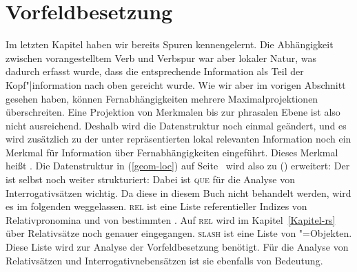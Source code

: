 \section{Vorfeldbesetzung}

Im letzten Kapitel haben wir bereits Spuren kennengelernt. Die Abhängigkeit zwischen vorangestelltem
Verb und Verbspur war aber lokaler Natur, was dadurch erfasst wurde, dass die entsprechende Information
als Teil der Kopf"|information nach oben gereicht wurde. Wie wir aber im vorigen Abschnitt gesehen haben,
können Fernabhängigkeiten mehrere Maximalprojektionen überschreiten. Eine Projektion von Merkmalen
bis zur phrasalen Ebene ist also nicht ausreichend. Deshalb wird die Datenstruktur noch einmal geändert,
und es wird zusätzlich zu der unter \local repräsentierten lokal relevanten Information noch ein
Merkmal für Information über Fernabhängigkeiten eingeführt. Dieses Merkmal heißt \nonloc.
Die Datenstruktur in (\ref{geom-loc}) auf Seite~\pageref{geom-loc} wird also zu () erweitert:
\ea
\label{geom-nonloc}
\z
Der \nonlocw ist selbst noch weiter strukturiert:
\ea
{}
\z
Dabei ist \textsc{que} für die Analyse von Interrogativsätzen wichtig. Da diese in diesem Buch nicht behandelt
werden, wird es im folgenden weggelassen. \textsc{rel} ist eine Liste referentieller Indizes von
Relativpronomina und von bestimmten \ltopwen. Auf \textsc{rel} wird im Kapitel~\ref{Kapitel-rs} über
Relativsätze noch genauer eingegangen. \textsc{slash} ist eine Liste von
"=Objekten. Diese Liste wird zur Analyse der Vorfeldbesetzung benötigt. Für die Analyse
von Relativsätzen und Interrogativnebensätzen ist sie ebenfalls von Bedeutung.


